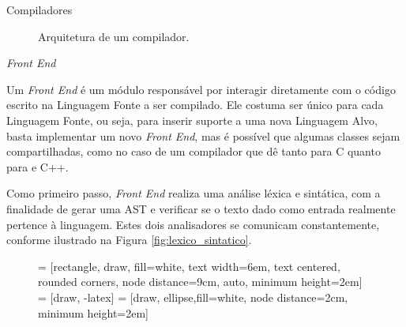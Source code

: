 \begin{section}{Compiladores}
\begin{figure}
\begin{center}
{
}
\end{center}

\caption{Arquitetura de um compilador.}
\label{fig:compiler_arch}
\end{figure}

\begin{subsection}{\textit{Front End}}

Um \textit{Front End} é um módulo responsável por interagir diretamente com o
código escrito na Linguagem Fonte a ser compilado. Ele costuma ser único
para cada Linguagem Fonte, ou seja, para inserir suporte a uma nova
Linguagem Alvo, basta implementar um novo \textit{Front End}, mas é
possível que algumas classes sejam
compartilhadas, como no caso de um compilador que dê tanto para C quanto para e C++.


Como primeiro passo, \textit {Front End} realiza uma análise
léxica e sintática, com a finalidade de gerar uma AST e verificar
se o texto dado como entrada realmente pertence à linguagem.
Estes dois analisadores se comunicam constantemente, conforme ilustrado na Figura
\ref{fig:lexico_sintatico}.


\begin{figure}
 = [rectangle, draw, fill=white,
    text width=6em, text centered, rounded corners, node distance=9cm, auto, minimum height=2em]
 = [draw, -latex]
 = [draw, ellipse,fill=white, node distance=2cm,
    minimum height=2em]

\begin{center}
\end{center}
\end{figure}
\end{subsection}
\end{section}
